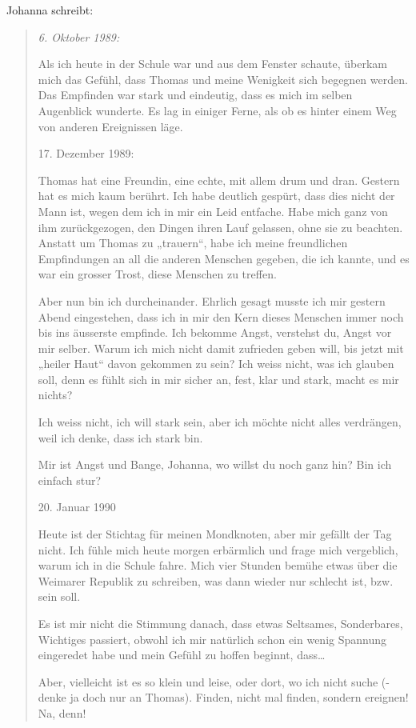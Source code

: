 \documentclass[10pt,titlepage,a5paper]{book}
\newenvironment{tg}{\begin{quote}\em}{\end{quote}}
\begin{document}
Johanna schreibt:
\begin{tg}
6. Oktober 1989:

Als ich heute in der Schule war und aus dem Fenster schaute, überkam mich das Gefühl, dass Thomas und meine Wenigkeit sich begegnen werden. Das Empfinden war stark und eindeutig, dass es mich im selben Augenblick wunderte. Es lag in einiger Ferne, als ob es hinter einem Weg von anderen Ereignissen läge.

17. Dezember 1989:

Thomas hat eine Freundin, eine echte, mit allem drum und dran. Gestern hat es mich kaum berührt. Ich habe deutlich gespürt, dass dies nicht der Mann ist, wegen dem ich in mir ein Leid entfache. Habe mich ganz von ihm zurückgezogen, den Dingen ihren Lauf gelassen, ohne sie zu beachten. Anstatt um Thomas zu „trauern“, habe ich meine freundlichen Empfindungen an all die anderen Menschen gegeben, die ich kannte, und es war ein grosser Trost, diese Menschen zu treffen.

Aber nun bin ich durcheinander. Ehrlich gesagt musste ich mir gestern Abend eingestehen, dass ich in mir den Kern dieses Menschen immer noch bis ins äusserste empfinde. Ich bekomme Angst, verstehst du, Angst vor mir selber. Warum ich mich nicht damit zufrieden geben will, bis jetzt mit „heiler Haut“ davon gekommen zu sein? Ich weiss nicht, was ich glauben soll, denn es fühlt sich in mir sicher an, fest, klar und stark, macht es mir nichts?

Ich weiss nicht, ich will stark sein, aber ich möchte nicht alles verdrängen, weil ich denke, dass ich stark bin.

Mir ist Angst und Bange, Johanna, wo willst du noch ganz hin?
Bin ich einfach stur?

20. Januar 1990

Heute ist der Stichtag für meinen Mondknoten, aber mir gefällt der Tag nicht. Ich fühle mich heute morgen erbärmlich und frage mich vergeblich, warum ich in die Schule fahre. Mich vier Stunden bemühe etwas über die Weimarer Republik zu schreiben, was dann wieder nur schlecht ist, bzw. sein soll.

Es ist mir nicht die Stimmung danach, dass etwas Seltsames, Sonderbares, Wichtiges passiert, obwohl ich mir natürlich schon ein wenig Spannung eingeredet habe und mein Gefühl zu hoffen beginnt, dass\dots 

Aber, vielleicht ist es so klein und leise, oder dort, wo ich nicht suche (- denke ja doch nur an Thomas). Finden, nicht mal finden, sondern ereignen! Na, denn!


\end{tg}
\end{document}
